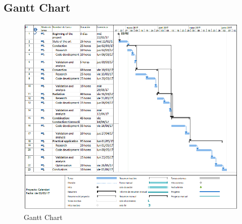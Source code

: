 \subsection{Gantt Chart}
\begin{figure}[h!]
\includegraphics[scale=0.7]{Gantt}
\caption{Gantt Chart}
\end{figure}